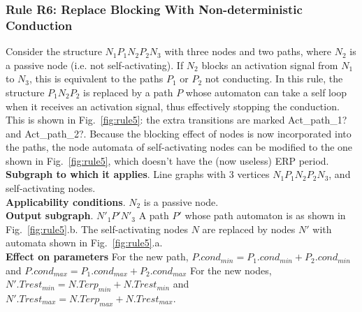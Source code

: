 %

\subsubsection{Rule R6: Replace Blocking With Non-deterministic Conduction}
Consider the structure $N_1 P_1 N_2 P_2 N_3$ with three nodes and two paths, where $N_2$ is a passive node (i.e. not self-activating).
If $N_2$ blocks an activation signal from $N_1$ to $N_3$, this is equivalent to the paths $P_1$ or $P_2$ not conducting.
In this rule, the structure $P_1 N_2 P_2$ is replaced by a path $P$ whose automaton can take a self loop when it receives an activation signal, thus effectively stopping the conduction. 
This is shown in Fig.~\ref{fig:rule5}: the extra transitions are marked Act\_path\_1? and Act\_path\_2?.
Because the blocking effect of nodes is now incorporated into the paths, the node automata of self-activating nodes can be modified to the one shown in Fig.~\ref{fig:rule5}, which doesn't have the (now useless) ERP period.
\\
\textbf{Subgraph to which it applies}.
Line graphs with 3 vertices $N_1 P_1 N_2 P_2 N_3$, and self-activating nodes.\\
\textbf{Applicability conditions}.
$N_2$ is a passive node.\\
\textbf{Output subgraph}.
$N'_1 P' N'_3$
A path $P'$ whose path automaton is as shown in Fig.~\ref{fig:rule5}.b.
The self-activating nodes $N$ are replaced by nodes $N'$ with automata shown in Fig.~\ref{fig:rule5}.a.\\
\textbf{Effect on parameters}
For the new path, $P.cond_{min}=P_1.cond_{min}+P_2.cond_{min}$ and 
$P.cond_{max}=P_1.cond_{max}+P_2.cond_{max}$
For the new nodes, $N'.Trest_{min}=N.Terp_{min}+N.Trest_{min}$ and 
$N'.Trest_{max}=N.Terp_{max}+N.Trest_{max}$.\\

